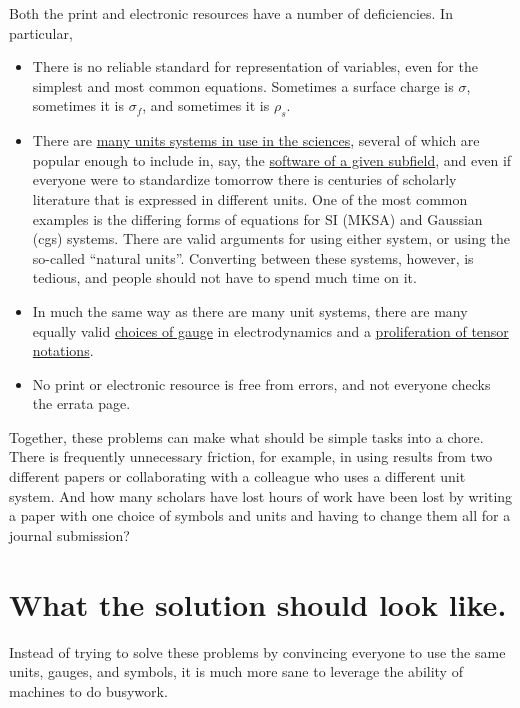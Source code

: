 \documentclass[12pt,letterpaper]{article}
\begin{document}
Both the print and electronic resources have a number of deficiencies. In particular,
\begin{itemize}
\item There is no reliable standard for representation of variables, even for the simplest and most common equations. Sometimes a surface charge is $\sigma$, sometimes it is $\sigma_f$, and sometimes it is $\rho_s$.
\item There are \href{https://en.wikipedia.org/wiki/Systems_of_units}{many units systems in use in the sciences}, several of which are popular enough to include in, say, the \href{http://lammps.sandia.gov/doc/units.html}{software of a given subfield}, and even if everyone were to standardize tomorrow there is centuries of scholarly literature that is expressed in different units. One of the most common examples is the differing forms of equations for SI (MKSA) and Gaussian (cgs) systems. There are valid arguments for using either system, or using the so-called ``natural units''. Converting between these systems, however, is tedious, and people should not have to spend much time on it.
\item In much the same way as there are many unit systems, there are many equally valid \href{https://en.wikipedia.org/wiki/Gauge_fixing}{choices of gauge} in electrodynamics and a \href{https://en.wikipedia.org/wiki/Tensor_notation}{proliferation of tensor notations}.
\item No print or electronic resource is free from errors, and not everyone checks the errata page.
\end{itemize}

Together, these problems can make what should be simple tasks into a chore. There is frequently unnecessary friction, for example, in using results from two different papers or collaborating with a colleague who uses a different unit system. And how many scholars have lost hours of work have been lost by writing a paper with one choice of symbols and units and having to change them all for a journal submission?

\section{What the solution should look like.}

Instead of trying to solve these problems by convincing everyone to use the same units, gauges, and symbols, it is much more sane to leverage the ability of machines to do busywork.
\end{document}
